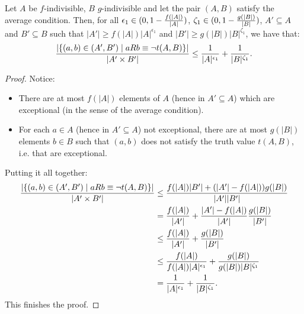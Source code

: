 
        \begin{lemma} \label{lem:exceptions_bound_of_f_indivisible_sets}
            Let $A$ be $f$-indivisible, $B$ $g$-indivisible and let the pair $(A,B)$ satisfy the average condition.
            Then, for all $\epsilon_1 \in ( 0, 1-\frac{f(|A|)}{|A|} )$, $\zeta_1 \in ( 0, 1-\frac{g(|B|)}{|B|} )$, $A' \subseteq A$
                and $B' \subseteq B$ such that $|A'| \geq f(|A|) |A|^{\epsilon_1}$ and $|B'| \geq g(|B|) |B|^{\zeta_1}$,
                we have that:
            \[
                \frac{|\{ (a,b) \in (A',B') \mid a R b \equiv \neg t(A,B) \}|}{|A' \times B'|} \leq
                    \frac{1}{|A|^{\epsilon_1}} + \frac{1}{|B|^{\zeta_1}}.
            \]
            \begin{proof}
                Notice:
                \begin{itemize}
                    \item There are at most $f(|A|)$ elements of $A$ (hence in $A' \subseteq A$) which are exceptional
                        (in the sense of the average condition).
                    \item For each $a \in A$ (hence in $A' \subseteq A$) not exceptional, there are at most $g(|B|)$ elements
                        $b \in B$ such that $(a,b)$ does not satisfy the truth value $t(A,B)$, i.e. that are exceptional.
                \end{itemize}
                Putting it all together:
                \[
                    \begin{split}
                        \frac{|\{ (a,b) \in (A',B') \mid a R b \equiv \neg t(A,B) \}|}{|A' \times B'|}
                            &\leq \frac{f(|A|) |B'| + (|A'| - f(|A|)) g(|B|)}{|A'| |B'|} \\
                            &= \frac{f(|A|)}{|A'|} + \frac{|A'| - f(|A|)}{|A'|} \frac{g(|B|)}{|B'|} \\
                            &\leq \frac{f(|A|)}{|A'|} + \frac{g(|B|)}{|B'|} \\
                            &\leq \frac{f(|A|)}{f(|A|) |A|^{\epsilon_1}} + \frac{g(|B|)}{g(|B|) |B|^{\zeta_1}} \\
                            &= \frac{1}{|A|^{\epsilon_1}} + \frac{1}{|B|^{\zeta_1}}.
                    \end{split}
                \]
                This finishes the proof.
            \end{proof}
        \end{lemma}


